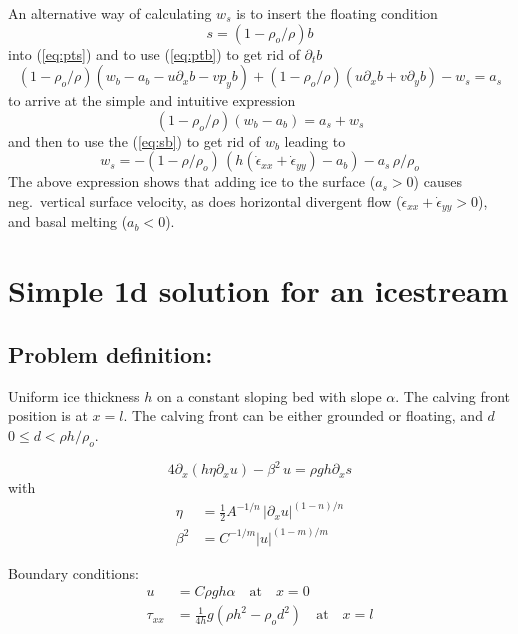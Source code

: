 \documentclass[10pt,a4paper]{book}
\newcommand{\p}{\partial}
\newcommand{\exx}{\dot{\epsilon}_{xx}}
\newcommand{\eyy}{\dot{\epsilon}_{yy}}
\begin{document}
An alternative way of calculating $w_s$ is to insert the floating condition
\[ 
s=(1-\rho_o/\rho) b 
\]
into (\ref{eq:pts}) and to use (\ref{eq:ptb}) to get rid of $\p_t b$ 
\begin{equation} 
(1-\rho_o/\rho) (w_b-a_b-u \p_x b-v p_y b) + (1-\rho_o/\rho) (u \p_x b + v \p_y b) -w_s =a_s 
\label{eq:pts2} 
\end{equation}
to arrive at the simple and intuitive expression
\begin{equation} 
(1-\rho_o/\rho) (w_b-a_b)  =a_s+w_s 
\label{eq:pts3} 
\end{equation}
and then to use the (\ref{eq:sb}) to get rid of $w_b$ leading to
\begin{equation} 
 w_s =  -(1-\rho/\rho_o)\,  \left (h(\exx+\eyy) - a_b\right ) - a_s \, \rho /\rho_o  
\label{eq:wsfloating3}
\end{equation} 
The above expression shows that adding ice to the surface ($a_s>0$)  causes neg.\ vertical
surface velocity, as does horizontal divergent flow ($\exx+\eyy>0$), and basal melting ($a_b<0$).




\chapter{Simple 1d solution for an icestream}

\section{Problem definition:} 
Uniform ice thickness $h$ on a constant sloping bed with slope
$\alpha$. The calving front position is at $x=l$. The calving front
can be either grounded or floating, and $d$ $0\le d < \rho h /\rho_o$.


\[
4 \p_x ( h \eta \p_x u) - \beta^2 \, u= \rho g h \p_x s
\]
with
\begin{align*}
\eta&=\frac{1}{2} A^{-1/n} \, | \p_x u | ^{(1-n)/n}  \\
\beta^2&=C^{-1/m} |u|^{(1-m)/m}
\end{align*}

Boundary conditions: 
\begin{align}
u&=C \rho g h \alpha  \quad \text{at} \quad x=0 \label{eq:bc1} \\
 \tau_{xx}&=\frac{1}{4h} g ( \rho h^2 - \rho_o d^2) \quad \text{at} \quad x=l \label{eq:bc2}
\end{align}
\end{document}
